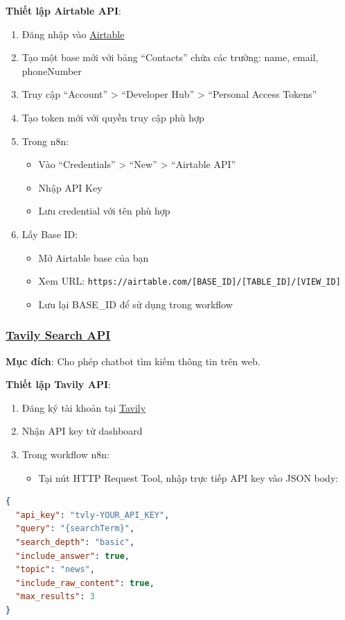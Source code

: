 \textbf{Thiết lập Airtable API}:
\begin{enumerate}
    \item Đăng nhập vào \href{https://airtable.com/}{Airtable}
    \item Tạo một base mới với bảng ``Contacts'' chứa các trường: name, email, phoneNumber
    \item Truy cập ``Account'' > ``Developer Hub'' > ``Personal Access Tokens''
    \item Tạo token mới với quyền truy cập phù hợp
    \item Trong n8n:
    \begin{itemize}
        \item Vào ``Credentials'' > ``New'' > ``Airtable API''
        \item Nhập API Key
        \item Lưu credential với tên phù hợp
    \end{itemize}
    \item Lấy Base ID:
    \begin{itemize}
        \item Mở Airtable base của bạn
        \item Xem URL: \texttt{https://airtable.com/[BASE\_ID]/[TABLE\_ID]/[VIEW\_ID]}
        \item Lưu lại BASE\_ID để sử dụng trong workflow
    \end{itemize}
\end{enumerate}

\subsubsection{\underline{Tavily Search API}}
\textbf{Mục đích}: Cho phép chatbot tìm kiếm thông tin trên web.

\textbf{Thiết lập Tavily API}:
\begin{enumerate}
    \item Đăng ký tài khoản tại \href{https://tavily.com/}{Tavily}
    \item Nhận API key từ dashboard
    \item Trong workflow n8n:
    \begin{itemize}
        \item Tại nút HTTP Request Tool, nhập trực tiếp API key vào JSON body:
    \end{itemize}
\end{enumerate}

\begin{lstlisting}[language=json, basicstyle=\small\ttfamily]
{
  "api_key": "tvly-YOUR_API_KEY",
  "query": "{searchTerm}",
  "search_depth": "basic",
  "include_answer": true,
  "topic": "news",
  "include_raw_content": true,
  "max_results": 3
}
\end{lstlisting}

